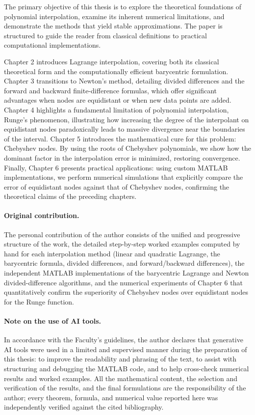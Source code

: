 \documentclass[12pt, a4paper]{article}
\theoremstyle{plain}
\theoremstyle{definition}
\theoremstyle{remark}
\begin{document}
The primary objective of this thesis is to explore the theoretical foundations of polynomial interpolation, examine its inherent numerical limitations, and demonstrate the methods that yield stable approximations. The paper is structured to guide the reader from classical definitions to practical computational implementations.

Chapter 2 introduces Lagrange interpolation, covering both its classical theoretical form and the computationally efficient barycentric formulation. Chapter 3 transitions to Newton's method, detailing divided differences and the forward and backward finite-difference formulas, which offer significant advantages when nodes are equidistant or when new data points are added. Chapter 4 highlights a fundamental limitation of polynomial interpolation, Runge's phenomenon, illustrating how increasing the degree of the interpolant on equidistant nodes paradoxically leads to massive divergence near the boundaries of the interval. Chapter 5 introduces the mathematical cure for this problem: Chebyshev nodes. By using the roots of Chebyshev polynomials, we show how the dominant factor in the interpolation error is minimized, restoring convergence. Finally, Chapter 6 presents practical applications: using custom MATLAB implementations, we perform numerical simulations that explicitly compare the error of equidistant nodes against that of Chebyshev nodes, confirming the theoretical claims of the preceding chapters.

\paragraph{Original contribution.} The personal contribution of the author consists of the unified and progressive structure of the work, the detailed step-by-step worked examples computed by hand for each interpolation method (linear and quadratic Lagrange, the barycentric formula, divided differences, and forward/backward differences), the independent MATLAB implementations of the barycentric Lagrange and Newton divided-difference algorithms, and the numerical experiments of Chapter 6 that quantitatively confirm the superiority of Chebyshev nodes over equidistant nodes for the Runge function.

\paragraph{Note on the use of AI tools.} In accordance with the Faculty's guidelines, the author declares that generative AI tools were used in a limited and supervised manner during the preparation of this thesis: to improve the readability and phrasing of the text, to assist with structuring and debugging the MATLAB code, and to help cross-check numerical results and worked examples. All the mathematical content, the selection and verification of the results, and the final formulations are the responsibility of the author; every theorem, formula, and numerical value reported here was independently verified against the cited bibliography.
\end{document}

